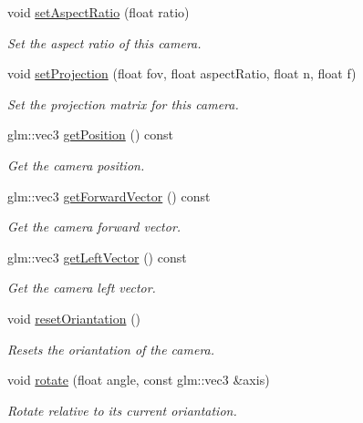 \begin{DoxyCompactItemize}
void \hyperlink{classce_1_1graphics_1_1_camera_a852f190ecd41998257e92d5e56769bce}{set\+Aspect\+Ratio} (float ratio)
\begin{DoxyCompactList}\small\item\em Set the aspect ratio of this camera. \end{DoxyCompactList}\item 
void \hyperlink{classce_1_1graphics_1_1_camera_a6145b8ef21c58b4426d2400aac9cefbf}{set\+Projection} (float fov, float aspect\+Ratio, float n, float f)
\begin{DoxyCompactList}\small\item\em Set the projection matrix for this camera. \end{DoxyCompactList}\item 
glm\+::vec3 \hyperlink{classce_1_1graphics_1_1_camera_aa0850a9ff6687843d2a5461299df774e}{get\+Position} () const
\begin{DoxyCompactList}\small\item\em Get the camera position. \end{DoxyCompactList}\item 
glm\+::vec3 \hyperlink{classce_1_1graphics_1_1_camera_a7ca3104f19525600d0314728a4d753d2}{get\+Forward\+Vector} () const
\begin{DoxyCompactList}\small\item\em Get the camera forward vector. \end{DoxyCompactList}\item 
glm\+::vec3 \hyperlink{classce_1_1graphics_1_1_camera_ad71aace8ffc9499b0997fc92d7ba596a}{get\+Left\+Vector} () const
\begin{DoxyCompactList}\small\item\em Get the camera left vector. \end{DoxyCompactList}\item 
\mbox{\label{classce_1_1graphics_1_1_camera_ae3d5fbe2d4504bc665324ccde95ed10c}} 
void \hyperlink{classce_1_1graphics_1_1_camera_ae3d5fbe2d4504bc665324ccde95ed10c}{reset\+Oriantation} ()
\begin{DoxyCompactList}\small\item\em Resets the oriantation of the camera. \end{DoxyCompactList}\item 
void \hyperlink{classce_1_1graphics_1_1_camera_a72ea4add5776476ebdf572d770d7ce7f}{rotate} (float angle, const glm\+::vec3 \&axis)
\begin{DoxyCompactList}\small\item\em Rotate relative to its current oriantation. \end{DoxyCompactList}\item 

\end{DoxyCompactItemize}
